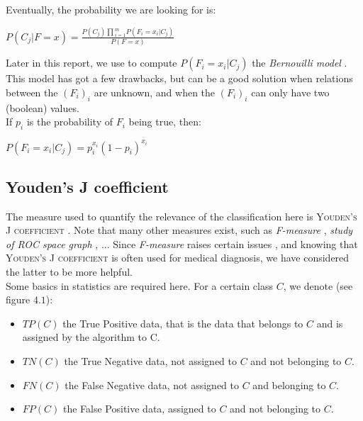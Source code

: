 \documentclass{report}
\begin{document}
Eventually, the probability we are looking for is:\\

\begin{center}
$P(C_{j} | F = x) = \frac{P(C_{j})\prod{_{i = 1}^{m}}{P(F_{i} = x_{i} | C_{j})}}{P(F = x)}$\\ 
\end{center}

Later in this report, we use to compute $P(F_{i} = x_{i} | C_{j})$ the \emph{Bernouilli model} \cite{NaiveBayes}. This model has got a few drawbacks, but can be a good solution when relations between the $(F_{i})_{i}$ are unknown, and when the $(F_{i})_{i}$ can only have two (boolean) values.\\

If $p_{i}$ is the probability of $F_{i}$ being true, then:\\
\begin{center}
$P(F_{i} = x_{i} | C_{j}) = p_{i}^{x_{i}}(1 - p_{i})^{x_{i}}$
\end{center}

\subsection{Youden's J coefficient}

The measure used to quantify the relevance of the classification here is \textsc{Youden's J coefficient} \cite{Youden}. Note that many other measures exist, such as \emph{F-measure} \cite{F-measure}, \emph{study of ROC space graph} \cite{IntroROC}, ... Since \emph{F-measure} raises certain issues \cite{FMproblems}, and knowing that \textsc{Youden's J coefficient} is often used for medical diagnosis, we have considered the latter to be more helpful.\\

Some basics in statistics are required here. For a certain class $C$, we denote (see figure $4.1$):
\begin{itemize}
\item $TP(C)$ the True Positive data, that is the data that belongs to $C$ and is assigned by the algorithm to \textsc{C}.
\item $TN(C)$ the True Negative data, not assigned to $C$ and not belonging to $C$.
\item $FN(C)$ the False Negative data, not assigned to $C$ and belonging to $C$.
\item $FP(C)$ the False Positive data, assigned to $C$ and not belonging to $C$.
\end{itemize}
\end{document}
